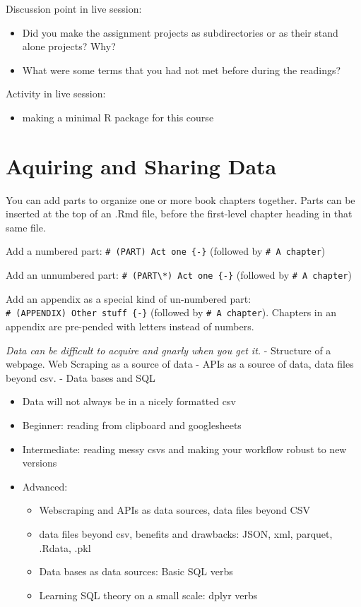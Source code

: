 \documentclass[
  12pt,
]{book}
\providecommand{\tightlist}{%
  \setlength{\itemsep}{0pt}\setlength{\parskip}{0pt}}
\theoremstyle{definition}
\theoremstyle{definition}
\theoremstyle{definition}
\theoremstyle{definition}
\theoremstyle{remark}
\begin{document}
Discussion point in live session:

\begin{itemize}
\tightlist
\item
  Did you make the assignment projects as subdirectories or as their stand alone projects? Why?
\item
  What were some terms that you had not met before during the readings?
\end{itemize}

Activity in live session:

\begin{itemize}
\tightlist
\item
  making a minimal R package for this course
\end{itemize}

\hypertarget{data}{%
\chapter{Aquiring and Sharing Data}\label{data}}

You can add parts to organize one or more book chapters together. Parts can be inserted at the top of an .Rmd file, before the first-level chapter heading in that same file.

Add a numbered part: \texttt{\#\ (PART)\ Act\ one\ \{-\}} (followed by \texttt{\#\ A\ chapter})

Add an unnumbered part: \texttt{\#\ (PART\textbackslash{}*)\ Act\ one\ \{-\}} (followed by \texttt{\#\ A\ chapter})

Add an appendix as a special kind of un-numbered part: \texttt{\#\ (APPENDIX)\ Other\ stuff\ \{-\}} (followed by \texttt{\#\ A\ chapter}). Chapters in an appendix are pre-pended with letters instead of numbers.

\emph{Data can be difficult to acquire and gnarly when you get it.}
- Structure of a webpage. Web Scraping as a source of data
- APIs as a source of data, data files beyond csv.
- Data bases and SQL

\begin{itemize}
\item
  Data will not always be in a nicely formatted csv
\item
  Beginner: reading from clipboard and googlesheets
\item
  Intermediate: reading messy csvs and making your workflow robust to new versions
\item
  Advanced:

  \begin{itemize}
  \tightlist
  \item
    Webscraping and APIs as data sources, data files beyond CSV
  \item
    data files beyond csv, benefits and drawbacks: JSON, xml, parquet, .Rdata, .pkl
  \item
    Data bases as data sources: Basic SQL verbs
  \item
    Learning SQL theory on a small scale: dplyr verbs
  \end{itemize}
\end{itemize}
\end{document}
